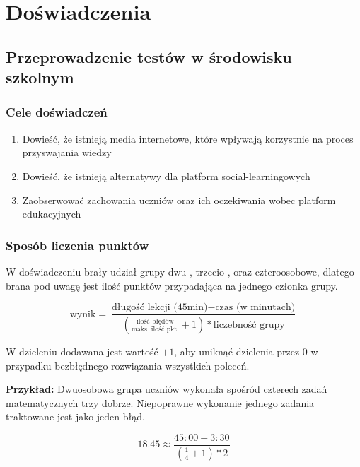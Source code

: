 \documentclass[10pt]{beamer}
\begin{document}
\section{Doświadczenia}
\subsection{Przeprowadzenie testów w środowisku szkolnym}

\begin{frame}
\frametitle{Cele doświadczeń}
\begin{enumerate}
  \item Dowieść, że istnieją media internetowe, które wpływają korzystnie na proces przyswajania wiedzy
  \item Dowieść, że istnieją alternatywy dla platform social-learningowych
  \item Zaobserwować zachowania uczniów oraz ich oczekiwania wobec platform edukacyjnych
\end{enumerate}
\end{frame}

\begin{frame}
\frametitle{Sposób liczenia punktów}
\small
W doświadczeniu brały udział grupy dwu-, trzecio-, oraz czteroosobowe, dlatego brana pod uwagę jest ilość punktów przypadająca na jednego członka grupy.

$$\text{wynik} = \frac{\text{długość lekcji (45min)} - \text{czas (w minutach)}}{ (\frac{\text{ilość błędów}}{\text{maks. ilość pkt.}}+1) * \text{liczebność grupy}}$$

W dzieleniu dodawana jest wartość $+1$, aby uniknąć dzielenia przez $0$ w przypadku bezbłędnego rozwiązania wszystkich poleceń.

\textbf{Przykład:} Dwuosobowa grupa uczniów wykonała spośród czterech zadań matematycznych trzy dobrze. Niepoprawne wykonanie jednego zadania traktowane jest jako jeden błąd.

$$18.45 \approx \frac{45:00 - 3:30}{ (\frac{1}{4}+1) * \text{2}}$$
\end{frame}
\end{document}
